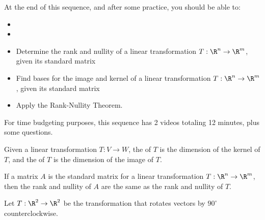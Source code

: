 







At the end of this sequence, and after some practice, you should be able to:

\begin{itemize}
\item
\item

\item Determine the rank and nullity of a linear transformation $T: \R^n \rightarrow \R^m$, given its
standard matrix
\item Find bases for the image and kernel of  a linear transformation $T: \R^n \rightarrow \R^m$, given its standard matrix
\item Apply the Rank-Nullity Theorem.  
\end{itemize}


For time budgeting purposes, this sequence has 2 videos totaling 12 minutes, 
plus some questions.  




\endedxtext

\endedxvertical









{}  
Given a linear transformation $T: V\rightarrow W$, the {} of $T$ is the
dimension of the kernel of $T$, and the {} of $T$ is the
dimension of the image of $T$. 

If a matrix $A$ is the standard matrix for a linear transformation $T:\R^n \rightarrow \R^m$, 
then the rank and nullity of $A$ are the same as the rank and nullity of $T$.  


\endedxtext


\endedxvertical






Let $T: \R^2 \rightarrow \R^2$ be the transformation that rotates vectors by $90^\circ$ counterclockwise.


